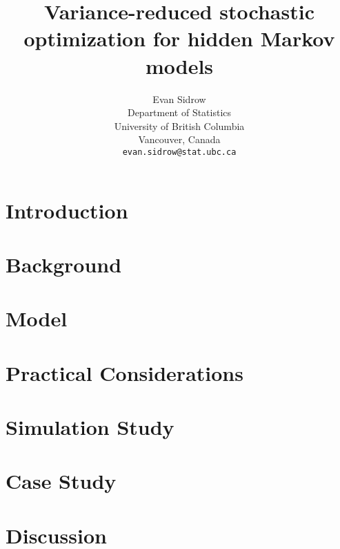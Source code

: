 \documentclass{article}
\title{Variance-reduced stochastic optimization for hidden Markov models}
\author{
  Evan Sidrow \\
  Department of Statistics\\
  University of British Columbia\\
  Vancouver, Canada \\
  \texttt{evan.sidrow@stat.ubc.ca} \\
}
\begin{document}
\maketitle


\section{Introduction}


\section{Background}


\section{Model}


\section{Practical Considerations}

\label{sec:prac}

\section{Simulation Study}


\section{Case Study}


\section{Discussion}


\newpage



\newpage
\begin{appendix}

\end{appendix}
\end{document}
